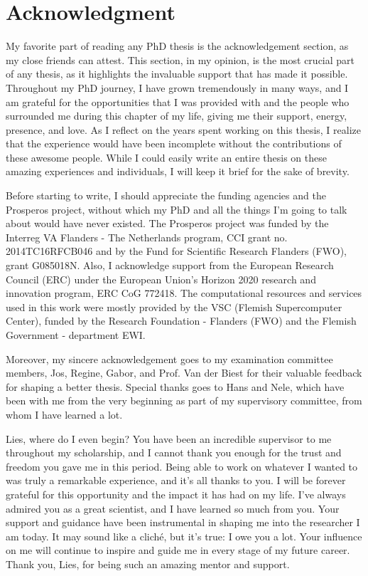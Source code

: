 \chapter*{Acknowledgment}                                  \label{ch:preface}

My favorite part of reading any PhD thesis is the acknowledgement section, as my close friends can attest. This section, in my opinion, is the most crucial part of any thesis, as it highlights the invaluable support that has made it possible. Throughout my PhD journey, I have grown tremendously in many ways, and I am grateful for the opportunities that I was provided with and the people who surrounded me during this chapter of my life, giving me their support, energy, presence, and love. As I reflect on the years spent working on this thesis, I realize that the experience would have been incomplete without the contributions of these awesome people. While I could easily write an entire thesis on these amazing experiences and individuals, I will keep it brief for the sake of brevity.

Before starting to write, I should appreciate the funding agencies and the Prosperos project, without which my PhD and all the things I'm going to talk about would have never existed. The Prosperos project was funded by the Interreg VA Flanders - The Netherlands program, CCI grant no. 2014TC16RFCB046 and by the Fund for Scientific Research Flanders (FWO), grant G085018N. Also, I acknowledge support from the European Research Council (ERC) under the European Union's Horizon 2020 research and innovation program, ERC CoG 772418. The computational resources and services used in this work were mostly provided by the VSC (Flemish Supercomputer Center), funded by the Research Foundation - Flanders (FWO) and the Flemish Government - department EWI. 

Moreover, my sincere acknowledgement goes to my examination committee members, Jos, Regine, Gabor, and Prof. Van der Biest for their valuable feedback for shaping a better thesis. Special thanks goes to Hans and Nele, which have been with me from the very beginning as part of my supervisory committee, from whom I have learned a lot.

Lies, where do I even begin? You have been an incredible supervisor to me throughout my scholarship, and I cannot thank you enough for the trust and freedom you gave me in this period. Being able to work on whatever I wanted to was truly a remarkable experience, and it's all thanks to you. I will be forever grateful for this opportunity and the impact it has had on my life. I've always admired you as a great scientist, and I have learned so much from you. Your support and guidance have been instrumental in shaping me into the researcher I am today. It may sound like a cliché, but it's true: I owe you a lot. Your influence on me will continue to inspire and guide me in every stage of my future career. Thank you, Lies, for being such an amazing mentor and support.

